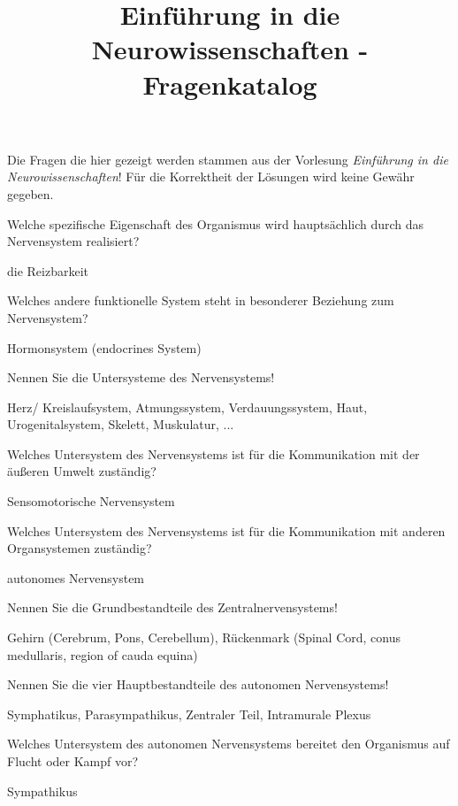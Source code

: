 \documentclass[10pt, a4paper]{exam}
\title{Einführung in die Neurowissenschaften - Fragenkatalog}
\author{}
\date{}
\begin{document}
\begin{myboxii}[Disclaimer]
  Die Fragen die hier gezeigt werden stammen aus der Vorlesung \textit{Einführung in die Neurowissenschaften}! Für die Korrektheit der Lösungen wird keine Gewähr gegeben.
\end{myboxii}

\begin{questions}
  \question Welche spezifische Eigenschaft des Organismus wird hauptsächlich durch das Nervensystem realisiert?
  \begin{solution}
    die Reizbarkeit
  \end{solution}

  \question Welches andere funktionelle System steht in besonderer Beziehung zum Nervensystem?
  \begin{solution}
    Hormonsystem (endocrines System)
  \end{solution}

  \question Nennen Sie die Untersysteme des Nervensystems!
  \begin{solution}
    Herz/ Kreislaufsystem, Atmungssystem, Verdauungssystem, Haut, Urogenitalsystem, Skelett,
    Muskulatur, ...
  \end{solution}

  \question Welches Untersystem des Nervensystems ist für die Kommunikation mit der äußeren Umwelt zuständig?
  \begin{solution}
    Sensomotorische Nervensystem
  \end{solution}

  \question Welches Untersystem des Nervensystems ist für die Kommunikation mit anderen Organsystemen zuständig?
  \begin{solution}
    autonomes Nervensystem
  \end{solution}

  \question Nennen Sie die Grundbestandteile des Zentralnervensystems!
  \begin{solution}
    Gehirn (Cerebrum, Pons, Cerebellum), Rückenmark (Spinal Cord, conus medullaris, region of
    cauda equina)
  \end{solution}

  \question Nennen Sie die vier Hauptbestandteile des autonomen Nervensystems!
  \begin{solution}
    Symphatikus, Parasympathikus, Zentraler Teil, Intramurale Plexus
  \end{solution}

  \question Welches Untersystem des autonomen Nervensystems bereitet den Organismus auf Flucht oder Kampf vor?
  \begin{solution}
    Sympathikus
  \end{solution}


\end{questions}
\end{document}
